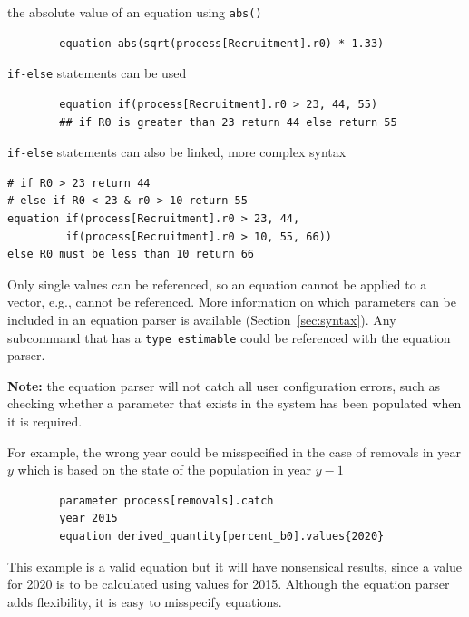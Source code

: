 the absolute value of an equation using \texttt{abs()}

{\small{\begin{verbatim}
		equation abs(sqrt(process[Recruitment].r0) * 1.33)
\end{verbatim}}}

\texttt{if-else} statements can be used

{\small{\begin{verbatim}
		equation if(process[Recruitment].r0 > 23, 44, 55)
		## if R0 is greater than 23 return 44 else return 55
\end{verbatim}}}

\texttt{if-else} statements can also be linked, more complex syntax

{\small{\begin{verbatim}
# if R0 > 23 return 44
# else if R0 < 23 & r0 > 10 return 55
equation if(process[Recruitment].r0 > 23, 44,
         if(process[Recruitment].r0 > 10, 55, 66))
else R0 must be less than 10 return 66
\end{verbatim}}}

Only single values can be referenced, so an equation cannot be applied to a vector, e.g.,  cannot be referenced. More information on which parameters can be included in an equation parser is available (Section~\ref{sec:syntax}). Any subcommand that has a \texttt{type estimable} could be referenced with the equation parser.

\textbf{Note:} the equation parser will not catch all user configuration errors, such as checking whether a parameter that exists in the system has been populated when it is required.

For example, the wrong year could be misspecified in the case of removals in year $y$ which is based on the state of the population in year $y-1$

{\small{\begin{verbatim}
		parameter process[removals].catch
		year 2015
		equation derived_quantity[percent_b0].values{2020}
\end{verbatim}}}

This example is a valid equation but it will have nonsensical results, since a value for 2020 is to be calculated using values for 2015. Although the equation parser adds flexibility, it is easy to misspecify equations.


\subsection{}\label{sec:Project} 

